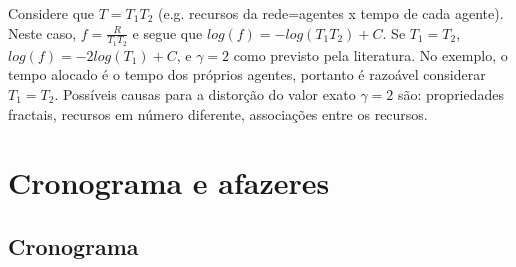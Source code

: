 \documentclass[a4paper,openright,12pt]{report} %
\begin{document}
Considere que $T=T_1 T_2$ 
(e.g. recursos da rede=agentes x tempo de cada agente). 
Neste caso,
$f=\frac{R}{T_1 T_2}$ e
segue que $log(f)=-log(T_1 T_2) +C$. Se $T_1=T_2$, 
$log(f)=-2 log(T_1) + C$, e
$\gamma=2$ como previsto pela literatura.
No exemplo, o tempo alocado
é o tempo dos próprios agentes,
portanto é razoável considerar $T_1=T_2$. 
Possíveis causas para a distorção do valor exato $\gamma=2$
são: propriedades fractais, recursos em número diferente, associações entre os recursos. 

\chapter{Cronograma e afazeres}\label{sec:chr}

\section{Cronograma}\label{sec:cron}
\end{document}
